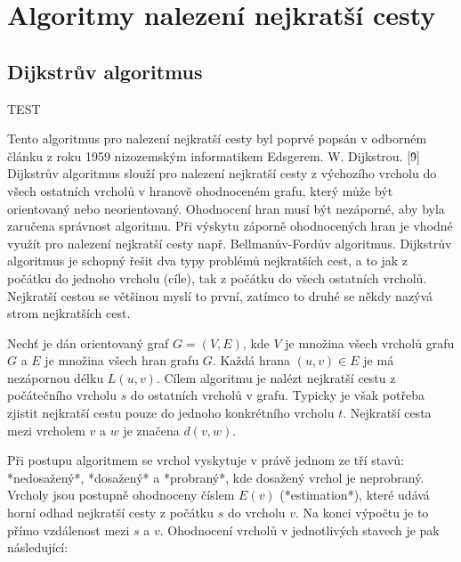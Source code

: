 \chapter{Algoritmy nalezení nejkratší cesty}
\section{Dijkstrův algoritmus}

TEST \cite{RezvanianSocNetworks,SunPowerGrid} \cite{heimerl1988german} \cite{bauer2011experimental,lauter05Arcs} \cite{hilger2008fast} \cite{mohring2005partitioning} \cite{SchultesRoutePlanning} \cite{lazarsfeldGuide} \cite{ericksonShortestPaths}\cite{madkour2017survey} \cite{dibbelt2017CSA} \cite{tejaDynamic} \cite{CMUBinHeaps} \cite{pyrga2008efficient,PYRGA2004TowardsRealistic}

\cite{BatzTDCH,NanniciniBiDiA} \cite{}

Tento algoritmus pro nalezení nejkratší cesty byl poprvé popsán v odborném článku z roku 1959 nizozemským informatikem Edsgerem. W. Dijkstrou. \cite{Dijkstra59}[\^9] Dijkstrův algoritmus slouží pro nalezení nejkratší cesty z výchozího vrcholu do všech ostatních vrcholů v hranově ohodnoceném grafu, který může být orientovaný nebo neorientovaný. Ohodnocení hran musí být nezáporné, aby byla zaručena správnost algoritmu. Při výskytu záporně ohodnocených hran je vhodné využít pro nalezení nejkratší cesty např. Bellmanův-Fordův algoritmus. Dijkstrův algoritmus je schopný řešit dva typy problémů nejkratších cest, a to jak z počátku do jednoho vrcholu (cíle), tak z počátku do všech ostatních vrcholů. Nejkratší cestou se většinou myslí to první, zatímco to druhé se někdy nazývá strom nejkratších cest.

Nechť je dán orientovaný graf $G = (V, E)$, kde $V$ je množina všech vrcholů grafu $G$ a $E$ je množina všech hran grafu $G$. Každá hrana $(u,v) \in E$ je má nezápornou délku $L(u,v)$. Cílem algoritmu je nalézt nejkratší cestu z počátečního vrcholu $s$ do ostatních vrcholů v grafu. Typicky je však potřeba zjistit nejkratší cestu pouze do jednoho konkrétního vrcholu $t$.  Nejkratší cesta mezi vrcholem $v$ a $w$ je značena $d(v,w)$.

Při postupu algoritmem se vrchol vyskytuje v právě jednom ze tří stavů: *nedosažený*, *dosažený* a *probraný*, kde dosažený vrchol je neprobraný. Vrcholy jsou postupně ohodnoceny číslem $E(v)$ (*estimation*), které udává horní odhad nejkratší cesty z počátku $s$ do vrcholu $v$. Na konci výpočtu je to přímo vzdálenost mezi $s$ a $v$. Ohodnocení vrcholů v jednotlivých stavech je pak následující:


